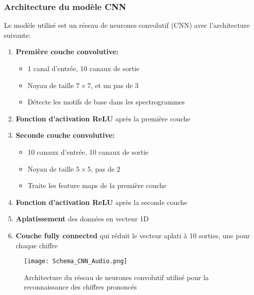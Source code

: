 \subsubsection{Architecture du modèle CNN}
\label{subsubsec:architecture}

Le modèle utilisé est un réseau de neurones convolutif (CNN) avec l'architecture suivante:

\begin{enumerate}
    \item \textbf{Première couche convolutive:}
    \begin{itemize}
        \item 1 canal d'entrée, 10 canaux de sortie
        \item Noyau de taille $7 \times 7$, et un pas de 3
        \item Détecte les motifs de base dans les spectrogrammes
    \end{itemize}
    
    \item \textbf{Fonction d'activation ReLU} après la première couche
    
    \item \textbf{Seconde couche convolutive:}
    \begin{itemize}
        \item 10 canaux d'entrée, 10 canaux de sortie
        \item Noyau de taille $5 \times 5$, pas de 2
        \item Traite les feature maps de la première couche
    \end{itemize}
    
    \item \textbf{Fonction d'activation ReLU} après la seconde couche
    
    \item \textbf{Aplatissement} des données en vecteur 1D
    
    \item \textbf{Couche fully connected} qui réduit le vecteur aplati à 10 sorties, une pour chaque chiffre
\end{enumerate}

\begin{figure}[H]
    \centering
    \texttt{[image: Schema\_CNN\_Audio.png]}
    \caption{Architecture du réseau de neurones convolutif utilisé pour la reconnaissance des chiffres prononcés}
    \label{fig:cnn_archi}
\end{figure}

